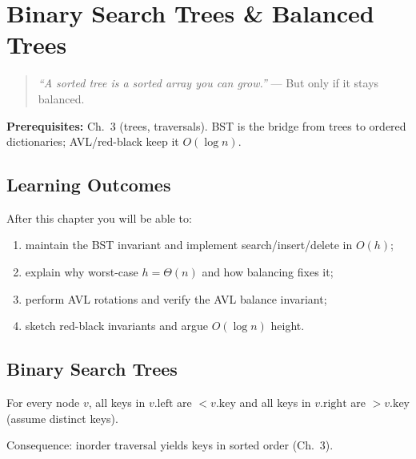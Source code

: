 \chapter{Binary Search Trees \& Balanced Trees}
\label{ch:bst-balanced}

\begin{quote}
\emph{``A sorted tree is a sorted array you can grow.''} --- But only if it stays balanced.
\end{quote}

\noindent\textbf{Prerequisites:} Ch.~3 (trees, traversals). BST is the bridge from trees to ordered dictionaries; AVL/red-black keep it $O(\log n)$.

\section*{Learning Outcomes}
After this chapter you will be able to:
\begin{enumerate}[label=(L\arabic*)]
    \item maintain the BST invariant and implement search/insert/delete in $O(h)$;
    \item explain why worst-case $h=\Theta(n)$ and how balancing fixes it;
    \item perform AVL rotations and verify the AVL balance invariant;
    \item sketch red-black invariants and argue $O(\log n)$ height.
\end{enumerate}

\section{Binary Search Trees}
\label{sec:bst}

\begin{definition}
For every node $v$, all keys in $v.\text{left}$ are $<v.\text{key}$ and all keys in $v.\text{right}$ are $>v.\text{key}$ (assume distinct keys).
\end{definition}

Consequence: inorder traversal yields keys in sorted order (Ch.~3).

